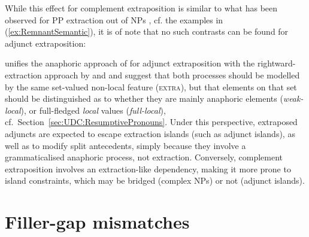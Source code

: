 \documentclass[output=paper
                ,modfonts
                ,nonflat
	        ,collection
	        ,collectionchapter
	        ,collectiontoclongg
 	        ,biblatex
                ,babelshorthands
                ,newtxmath
                ,draftmode
                ,colorlinks, citecolor=brown
]{./langsci/langscibook}
\begin{document}
{While this effect for complement extraposition is similar to what has
been observed for PP extraction out of NPs \citep{DeKuthy02}, cf. the
examples in (\ref{ex:RemnantSemantic}), it is of
note that no such contrasts can be found for adjunct extraposition:

\begin{exe}
\ex
\begin{xlist}
\end{xlist}
\end{exe}


\citet{crysmann_b09xtra} unifies the anaphoric approach of
\citet{kiss_t02nllt} for adjunct extraposition with the
rightward-extraction approach by \citet{Keller:95} and
\cite{Mueller99} and suggest that both processes should be modelled by
the same set-valued non-local feature (\textsc{extra}), but that
elements on that set should be distinguished as to whether they are
mainly anaphoric elements (\textit{weak-local}), or full-fledged
\textit{local} values (\textit{full-local}), cf.\ Section~\ref{sec:UDC:ResumptivePronouns}.  Under this perspective,
extraposed adjuncts are expected to escape extraction islands (such as
adjunct islands), as well as to modify split antecedents, simply
because they involve a grammaticalised anaphoric process, not
extraction. Conversely, complement extraposition involves an
extraction-like dependency, making it more prone to island
constraints, which may be bridged (complex NPs) or not (adjunct
islands).



\section{Filler-gap mismatches}
\label{sec:UDC:FillerGapMismatches}

}
\end{document}
